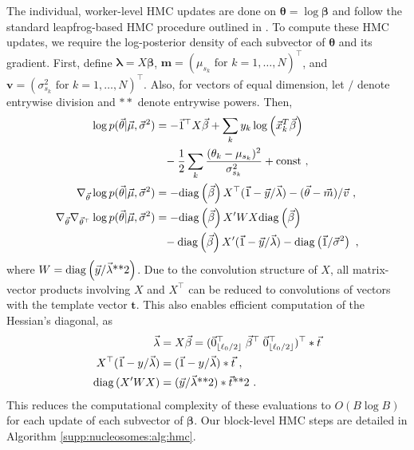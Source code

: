 The individual, worker-level HMC updates are done on $\bm \theta = \log \bm \beta$ and follow the standard leapfrog-based HMC procedure outlined in \citet{Neal2010}.
To compute these HMC updates, we require the log-posterior density of each subvector of $\bm \theta$ and its gradient.
First, define $\bm \lambda = X \bm \beta$, $\bm m = (\mu_{s_k} \mbox{ for } k = 1, \ldots, N)^\top$, and $\bm v = (\sigma^2_{s_k} \mbox{ for } k = 1, \ldots, N)^\top$.
Also, for vectors of equal dimension, let $/$ denote entrywise division and $**$ denote entrywise powers.
Then,
\begin{align}
\log p(\bm \theta | \bm \mu, \bm \sigma^2) &= -\bm 1^\top X \bm \beta + \sum_k y_k \log \left( \bm x_k^T \bm \beta \right) \\
\nonumber
&\phantom{=} - \frac{1}{2} \sum_k \frac{(\theta_k - \mu_{s_k})^2}{\sigma^2_{s_k}} + \mathrm{const} \ , \\
\nabla_{\bm \theta} \log p(\bm \theta | \bm \mu, \bm \sigma^2) &= -\diag{\bm \beta} X^\top (\bm 1 - \bm y / \bm \lambda) - (\bm \theta - \bm m) / \bm v \ , \\
\nabla_{\bm \theta} \nabla_{\bm \theta^\top} \log p(\bm \theta | \bm \mu, \bm \sigma^2) &= -\diag{\bm \beta} X'WX \diag{\bm \beta} \\
\nonumber
&\phantom{=} - \diag{\bm \beta} X' (\bm 1 - \bm y
/ \bm \lambda) - \diag{\bm 1 / \bm \sigma^2} \label{supp:nucleosomes:eq:hessian} \ ,
\end{align}
where $W = \mathrm{diag}\left(\vec y / \vec \lambda\mbox{**}2\right)$.
Due to the convolution structure of $X$, all matrix-vector products involving $X$ and $X^\top$ can be reduced to convolutions of vectors with the template vector $\bm t$.
This also enables efficient computation of the Hessian's diagonal, as
\begin{align}
\vec \lambda &= X \vec \beta = (\vec 0_{\lfloor \ell_0 / 2 \rfloor}^\top \; \vec \beta^\top \; \vec 0_{\lfloor \ell_0 / 2 \rfloor}^\top)^\top * \vec t \\
X^\top (\vec 1 - y / \vec \lambda) &= (\vec 1 - y / \vec \lambda) * \vec t \ , \\
\mathrm{diag}\left(X'WX\right) &= (\vec y / \vec \lambda\mbox{**}2) * \vec t\mbox{**}2 \ .
\end{align}
%
This reduces the computational complexity of these evaluations to $O(B \log B)$ for each update of each subvector of $\bm \beta$.
Our block-level HMC steps are detailed in Algorithm \ref{supp:nucleosomes:alg:hmc}.
%
